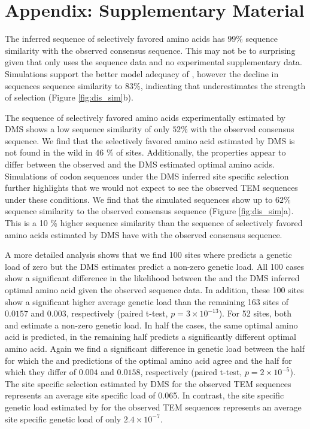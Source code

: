 \documentclass[fleqn,letterpaper]{article}
\begin{document}
\section{Appendix: Supplementary Material}

The \selac inferred sequence of selectively favored amino acids has $99 \%$ sequence similarity with the observed consensus sequence.
This may not be to surprising given that \selac only uses the sequence data and no experimental supplementary data.
Simulations support the better model adequacy of \selac, however the decline in sequences sequence similarity to $83 \%$, indicating that \selac underestimates the strength of selection (Figure \ref{fig:dis_sim}b).

The sequence of selectively favored amino acids experimentally estimated by DMS shows a low sequence similarity of only $52 \%$ with the observed consensus sequence. 
We find that the selectively favored amino acid estimated by DMS is not found in the wild in 46 \% of sites.
Additionally, the \PC properties appear to differ between the observed and the DMS estimated optimal amino acids.
Simulations of codon sequences under the DMS inferred site specific selection further highlights that we would not expect to see the observed TEM sequences under these conditions.
We find that the simulated sequences show up to $62 \%$ sequence similarity to the observed consensus sequence (Figure \ref{fig:dis_sim}a).
This is a 10 \% higher sequence similarity than the sequence of selectively favored amino acids estimated by DMS have with the observed consensus sequence. 

A more detailed analysis shows that we find 100 sites where \selac predicts a genetic load of zero but the DMS estimates predict a non-zero genetic load.
All 100 cases show a significant difference in the likelihood between the \selac and the DMS inferred optimal amino acid given the observed sequence data.
In addition, these 100 sites show a significant higher average genetic load than the remaining 163 sites of $0.0157$ and $0.003$, respectively (paired t-test, $p = 3\times10^{-13}$).
For 52 sites, both \phydms and \selac estimate a non-zero genetic load.
In half the cases, the same optimal amino acid is predicted, in the remaining half \phydms predicts a significantly different optimal amino acid.
Again we find a significant difference in genetic load between the half for which the \selac and \phydms predictions of the optimal amino acid agree and the half for which they differ of $0.004$ and $0.0158$, respectively (paired t-test, $p = 2\times 10^{-5}$).
The site specific selection estimated by DMS for the observed TEM sequences represents an average site specific load of 0.065.
In contrast, the site specific genetic load estimated by \selac for the observed TEM sequences represents an average site specific genetic load of only $2.4\times 10^{-7}$.
\end{document}

